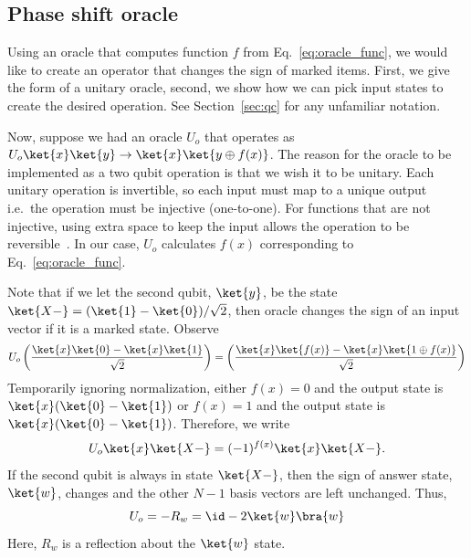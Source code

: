 \documentclass[11pt,oneside,final]{huthesis}%
\begin{document}

\subsection{Phase shift oracle}\label{sec:oracle}
Using an oracle that computes function $f$ from Eq.~\eqref{eq:oracle_func}, we would like to create an operator that changes the sign of marked items.  First, we give the form of a unitary oracle, second, we show how we can pick input states to create the desired operation. See Section~\ref{sec:qc} for any unfamiliar notation.

Now, suppose we had an oracle $U_o$ that operates as $U_o\ket{x}\ket{y}\rightarrow\ket{x}\ket{y\oplus f(x)}$.  The reason for the oracle to be implemented as a two qubit operation is that we wish it to be unitary.  Each unitary operation is invertible, so each input must map to a unique output i.e.~the operation must be injective (one-to-one).  For functions that are not injective, using extra space to keep the input allows the operation to be reversible~\cite{Bennett73}.  In our case, $U_o$ calculates $f(x)$ corresponding to Eq.~\eqref{eq:oracle_func}. 

Note that if we let the second qubit, $\ket{y}$, be the state $\ket{X-}=(\ket{1}-\ket{0})/\sqrt{2}$, then oracle changes the sign of an input vector if it is a marked state.  Observe
\[ U_o\left(\frac{\ket{x}\ket{0}-\ket{x}\ket{1}}{\sqrt{2}}\right)=\left(\frac{\ket{x}\ket{f(x)}-\ket{x}\ket{1\oplus f(x)}}{\sqrt{2}}\right)\]  Temporarily ignoring normalization, either $f(x)=0$ and the output state is $\ket{x}(\ket{0}-\ket{1})$ or $f(x)=1$ and the output state is $\ket{x}(\ket{0}-\ket{1})$. Therefore, we write \[U_o\ket{x}\ket{X-}=(-1)^{f(x)}\ket{x}\ket{X-}.\] If the second qubit is always in state $\ket{X-}$, then the sign of answer state, $\ket{w}$, changes and the other $N-1$ basis vectors are left unchanged.  Thus,
\begin{equation}
	 U_o=-R_w= \id - 2\ket{w}\bra{w}\label{eq:oracle}
 \end{equation}
 Here, $R_w$ is a reflection about the $\ket{w}$ state.
\end{document}
